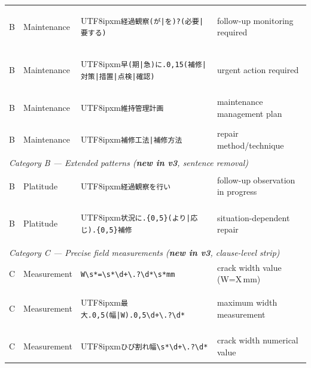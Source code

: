 \documentclass[onecolumn]{article}
\begin{document}
\begin{table}[h]
\begin{tabular}{p{0.5cm} p{1.7cm} p{5.8cm} p{4.5cm}}
B & Maintenance & \begin{CJK}{UTF8}{ipxm}\texttt{経過観察(が|を)?(必要|要する)}\end{CJK} & follow-up monitoring required \\
B & Maintenance & \begin{CJK}{UTF8}{ipxm}\texttt{早(期|急)に.{0,15}(補修|対策|措置|点検|確認)}\end{CJK} & urgent action required \\
B & Maintenance & \begin{CJK}{UTF8}{ipxm}\texttt{維持管理計画}\end{CJK} & maintenance management plan \\
B & Maintenance & \begin{CJK}{UTF8}{ipxm}\texttt{補修工法|補修方法}\end{CJK} & repair method/technique \\
\midrule
\multicolumn{4}{l}{\textit{Category B --- Extended patterns (\textbf{new in v3}, sentence removal)}} \\
B & Platitude & \begin{CJK}{UTF8}{ipxm}\texttt{経過観察を行い}\end{CJK} & follow-up observation in progress \\
B & Platitude & \begin{CJK}{UTF8}{ipxm}\texttt{状況に.\{0,5\}(より|応じ).\{0,5\}補修}\end{CJK} & situation-dependent repair \\
\midrule
\multicolumn{4}{l}{\textit{Category C --- Precise field measurements (\textbf{new in v3}, clause-level strip)}} \\
C & Measurement & \texttt{W\textbackslash{}s*=\textbackslash{}s*\textbackslash{}d+\textbackslash{}.?\textbackslash{}d*\textbackslash{}s*mm} & crack width value (W=X\,mm) \\
C & Measurement & \begin{CJK}{UTF8}{ipxm}\texttt{最大.{0,5}(幅|W).{0,5}\textbackslash{}d+\textbackslash{}.?\textbackslash{}d*}\end{CJK} & maximum width measurement \\
C & Measurement & \begin{CJK}{UTF8}{ipxm}\texttt{ひび割れ幅\textbackslash{}s*\textbackslash{}d+\textbackslash{}.?\textbackslash{}d*}\end{CJK} & crack width numerical value \\
\bottomrule
\end{tabular}
\end{table}
\end{document}
